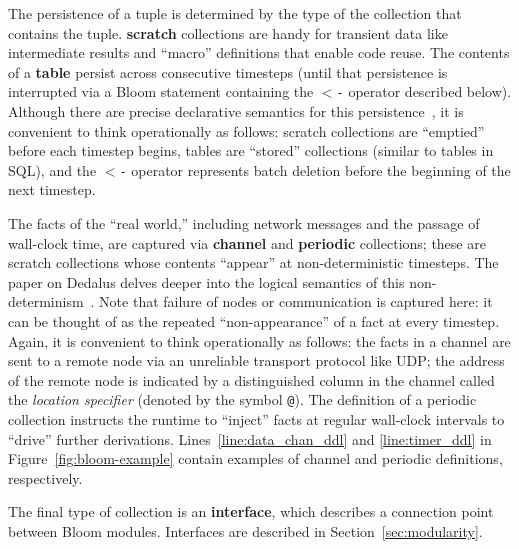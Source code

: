The persistence of a tuple is determined by the type of the collection that
contains the tuple. \textbf{scratch} collections are handy for transient data
like intermediate results and ``macro'' definitions that enable code reuse. The
contents of a \textbf{table} persist across consecutive timesteps (until that
persistence is interrupted via a Bloom statement containing the \texttt{$<$-}
operator described below). Although there are precise declarative semantics for
this persistence~\cite{dedalus}, it is convenient to think operationally as
follows: scratch collections are ``emptied'' before each timestep begins, tables
are ``stored'' collections (similar to tables in SQL), and the \texttt{$<$-}
operator represents batch deletion before the beginning of the next timestep.

The facts of the ``real world,'' including network messages and the passage of
wall-clock time, are captured via \textbf{channel} and \textbf{periodic}
collections; these are scratch collections whose contents ``appear'' at
non-deterministic timesteps.  The paper on Dedalus delves deeper into the
logical semantics of this non-determinism~\cite{dedalus}. Note that failure of
nodes or communication is captured here: it can be thought of as the repeated
``non-appearance'' of a fact at every timestep.  Again, it is convenient to
think operationally as follows: the facts in a channel are sent to a remote node
via an unreliable transport protocol like UDP; the address of the remote node is
indicated by a distinguished column in the channel called the \emph{location
  specifier} (denoted by the symbol \texttt{@}). The definition of a periodic
collection instructs the runtime to ``inject'' facts at regular wall-clock
intervals to ``drive'' further derivations. Lines~\ref{line:data_chan_ddl} and
\ref{line:timer_ddl} in Figure~\ref{fig:bloom-example} contain examples of
channel and periodic definitions, respectively.

The final type of collection is an \textbf{interface}, which describes a
connection point between Bloom modules. Interfaces are described in
Section~\ref{sec:modularity}.

